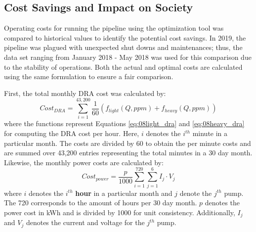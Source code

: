 \subsection{Cost Savings and Impact on Society}
Operating costs for running the pipeline using the optimization tool was compared to historical values to identify the potential cost savings.  In 2019, the pipeline was plagued with unexpected shut downs and maintenances; thus, the data set ranging from January 2018 - May 2018 was used for this comparison due to the stability of operations. Both the actual and optimal costs are calculated using the same formulation to ensure a fair comparison.  

First, the total monthly DRA cost was calculated by:
\begin{equation}
    Cost_{DRA} = \sum\limits^{43,200}_{i=1} \frac{1}{60} \left(f_{light}(Q, ppm) + f_{heavy}(Q, ppm)\right)
    \label{eq:08dra_cost}
\end{equation}
where the functions represent Equations \ref{eq:08light_dra} and \ref{eq:08heavy_dra} for computing the DRA cost per hour. Here, $i$ denotes the $i^{th}$ minute in a particular month. The costs are divided by 60 to obtain the per minute costs and are summed over 43,200 entries representing the total minutes in a 30 day month. Likewise, the monthly power costs are calculated by:
\begin{equation}
    Cost_{power} = \frac{p}{1000} \sum\limits^{720}_{i=1} \sum\limits^{6}_{j=1} I_j \cdot V_j
    \label{eq:08power_cost}
\end{equation}
where $i$ denotes the $i^{th}$ \textbf{hour} in a particular month and $j$ denote the $j^{th}$ pump. The 720 corresponds to the amount of hours per 30 day month. $p$ denotes the power cost in kWh and is divided by 1000 for unit consistency. Additionally, $I_j$ and $V_j$ denotes the current and voltage for the $j^{th}$ pump.

